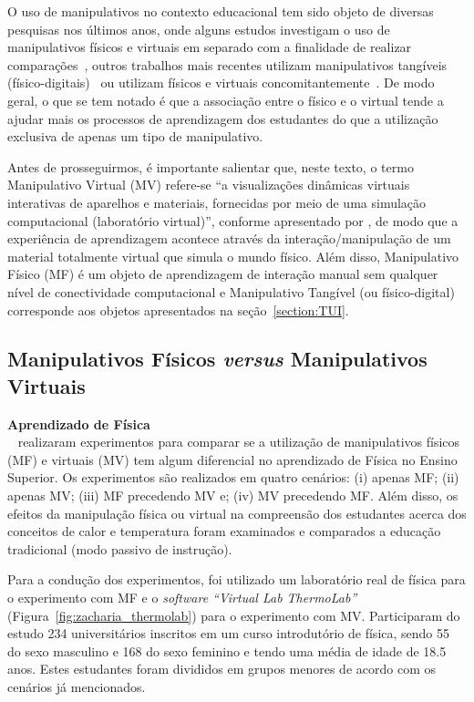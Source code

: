 O uso de manipulativos no contexto educacional tem sido objeto de diversas pesquisas nos últimos anos, onde alguns estudos investigam o uso de manipulativos físicos e virtuais em separado com a finalidade de realizar comparações~\citep{zacharia:2011, Salehi:2014}, outros trabalhos mais recentes utilizam manipulativos tangíveis (físico-digitais)~\citep{ha:2018, Azad:2016} ou utilizam físicos e virtuais concomitantemente~\citep{Blikstein:2012, Blikstein2016}. De modo geral, o que se tem notado é que a associação entre o físico e o virtual tende a ajudar mais os processos de aprendizagem dos estudantes do que a utilização exclusiva de apenas um tipo de manipulativo. %

Antes de prosseguirmos, é importante salientar que, neste texto, o termo Manipulativo Virtual (MV) refere-se ``a visualizações dinâmicas virtuais interativas de aparelhos e materiais, fornecidas por meio de uma simulação computacional (laboratório virtual)'', conforme apresentado por \cite{zacharia:2011}, de modo que a experiência de aprendizagem acontece através da interação/manipulação de um material totalmente virtual que simula o mundo físico. Além disso, Manipulativo Físico (MF) é um objeto de aprendizagem de interação manual sem qualquer nível de conectividade computacional e Manipulativo Tangível (ou físico-digital) corresponde aos objetos apresentados na seção~\ref{section:TUI}.

\subsection{Manipulativos Físicos \textit{versus} Manipulativos Virtuais}

\textbf{Aprendizado de Física}\\
~\cite{zacharia:2011} realizaram experimentos para comparar se a utilização de manipulativos físicos (MF) e virtuais (MV) tem algum diferencial no aprendizado de Física no Ensino Superior. Os experimentos são realizados em quatro cenários: (i) apenas MF; (ii) apenas MV; (iii) MF precedendo MV e; (iv) MV precedendo MF. Além disso, os efeitos da manipulação física ou virtual na compreensão dos estudantes acerca dos conceitos de calor e temperatura foram examinados e comparados a educação tradicional (modo passivo de instrução).

Para a condução dos experimentos, foi utilizado um laboratório real de física para o experimento com MF e o \textit{software ``Virtual Lab ThermoLab''} (Figura~\ref{fig:zacharia_thermolab}) para o experimento com MV. Participaram do estudo 234 universitários inscritos em um curso introdutório de física, sendo 55 do sexo masculino e 168 do sexo feminino e tendo uma média de idade de 18.5 anos. Estes estudantes foram divididos em grupos menores de acordo com os cenários já mencionados.

